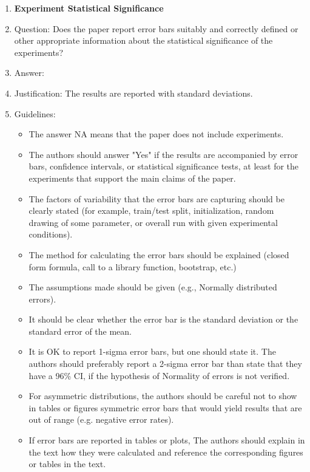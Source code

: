 \documentclass{article}
\begin{document}
\begin{enumerate}
\item {\bf Experiment Statistical Significance}
    \item[] Question: Does the paper report error bars suitably and correctly defined or other appropriate information about the statistical significance of the experiments?
    \item[] Answer: \answerYes{}
    \item[] Justification: The results are reported with standard deviations.
    \item[] Guidelines:
    \begin{itemize}
        \item The answer NA means that the paper does not include experiments.
        \item The authors should answer "Yes" if the results are accompanied by error bars, confidence intervals, or statistical significance tests, at least for the experiments that support the main claims of the paper.
        \item The factors of variability that the error bars are capturing should be clearly stated (for example, train/test split, initialization, random drawing of some parameter, or overall run with given experimental conditions).
        \item The method for calculating the error bars should be explained (closed form formula, call to a library function, bootstrap, etc.)
        \item The assumptions made should be given (e.g., Normally distributed errors).
        \item It should be clear whether the error bar is the standard deviation or the standard error of the mean.
        \item It is OK to report 1-sigma error bars, but one should state it. The authors should preferably report a 2-sigma error bar than state that they have a 96\% CI, if the hypothesis of Normality of errors is not verified.
        \item For asymmetric distributions, the authors should be careful not to show in tables or figures symmetric error bars that would yield results that are out of range (e.g. negative error rates).
        \item If error bars are reported in tables or plots, The authors should explain in the text how they were calculated and reference the corresponding figures or tables in the text.
    \end{itemize}


\end{enumerate}
\end{document}
